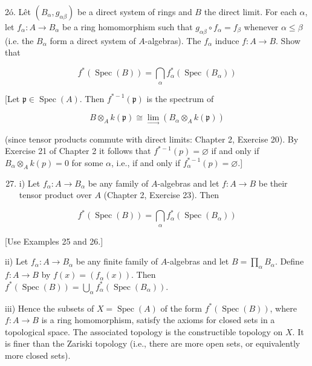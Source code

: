 \documentclass{standalone}
\theoremstyle{definition}
\theoremstyle{remark}
\begin{document}
2ó. Lêt $\left(B_{\alpha}, g_{\alpha \beta}\right)$ be a direct system of rings and $B$ the direct limit. For each $\alpha$, let $f_{\alpha}: A \rightarrow B_{\alpha}$ be a ring homomorphism such that $g_{\alpha \beta} \circ f_{\alpha}=f_{\beta}$ whenever $\alpha \leqslant \beta$ (i.e. the $B_{\alpha}$ form a direct system of $A$-algebras). The $f_{\alpha}$ induce $f: A \rightarrow B$. Show that

\[
f^{*}(\operatorname{Spec}(B))=\bigcap_{\alpha} f_{\alpha}^{*}\left(\operatorname{Spec}\left(B_{\alpha}\right)\right)
\]

[Let $\mathfrak{p} \in \operatorname{Spec}(A)$. Then $f^{*-1}(\mathfrak{p})$ is the spectrum of

\[
B \otimes_{A} k(\mathfrak{p}) \cong \lim _{\longrightarrow}\left(B_{\alpha} \otimes_{A} k(\mathfrak{p})\right)
\]

(since tensor products commute with direct limits: Chapter 2, Exercise 20). By Exercise 21 of Chapter 2 it follows that $f^{*-1}(p)=\varnothing$ if and only if $B_{\alpha} \otimes_{A} k(p)=0$ for some $\alpha$, i.e., if and only if $f_{\alpha}^{*-1}(p)=\varnothing$.]

\begin{enumerate}
  \setcounter{enumi}{26}
  \item i) Let $f_{\alpha}: A \rightarrow B_{\alpha}$ be any family of $A$-algebras and let $f: A \rightarrow B$ be their tensor product over $A$ (Chapter 2, Exercise 23). Then
\end{enumerate}

\[
f^{*}(\operatorname{Spec}(B))=\bigcap_{\alpha} f_{\alpha}^{*}\left(\operatorname{Spec}\left(B_{\alpha}\right)\right)
\]

[Use Examples 25 and 26.]

ii) Let $f_{\alpha}: A \rightarrow B_{\alpha}$ be any finite family of $A$-algebras and let $B=\prod_{\alpha} B_{\alpha}$. Define $f: A \rightarrow B$ by $f(x)=\left(f_{\alpha}(x)\right)$. Then $f^{*}(\operatorname{Spec}(B))=\bigcup_{\alpha} f_{\alpha}^{*}\left(\operatorname{Spec}\left(B_{\alpha}\right)\right)$.

iii) Hence the subsets of $X=\operatorname{Spec}(A)$ of the form $f^{*}(\operatorname{Spec}(B))$, where $f: A \rightarrow B$ is a ring homomorphism, satisfy the axioms for closed sets in a topological space. The associated topology is the constructible topology on $X$. It is finer than the Zariski topology (i.e., there are more open sets, or equivalently more closed sets).
\end{document}
